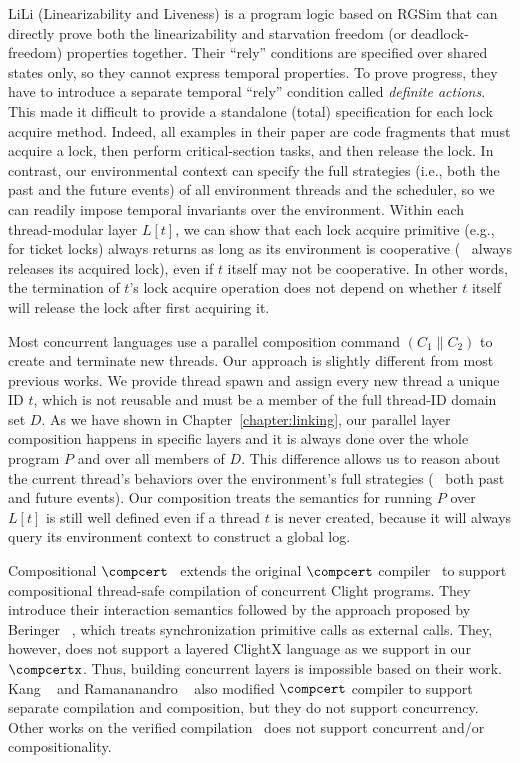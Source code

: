 LiLi (Linearizability and Liveness) is a program logic based on RGSim
that can
directly prove both the linearizability and starvation freedom (or
deadlock-freedom) properties together. 
Their ``rely'' conditions are specified
over shared states only, so they cannot express temporal properties. 
To prove progress, they have to introduce a separate temporal ``rely''
condition called {\em definite actions}.  This made it difficult to
provide a standalone (total) specification for each lock acquire
method.  Indeed, all examples in their paper are code fragments that
must acquire a lock, then perform critical-section tasks, and then release the
lock. In contrast, our environmental context can specify the full
strategies (i.e., both the past and the future events) of all
environment threads and the scheduler, so we can readily impose
temporal invariants over the environment. Within each thread-modular
layer $L[t]$, we can show that each lock acquire primitive (e.g., for
ticket locks) always returns as long as its environment is cooperative
(\eg~ always releases its acquired lock), even if $t$ itself may not
be cooperative.
In other words, the termination of $t$'s lock acquire
operation does not depend on whether $t$ itself will release the lock
after first acquiring it.

Most concurrent languages use a
parallel composition command $(C_1 \| C_2)$ to create and terminate
new threads.  
Our approach is slightly different from most previous works.
We provide thread spawn and assign every new thread a unique ID $t$,
which is not reusable and must be a member of the full thread-ID domain set $D$.
As we have shown in Chapter~\ref{chapter:linking},
our parallel layer composition happens in specific layers and it is
always done over the whole program $P$ and over
all members of $D$. 
This difference allows us to reason about the current
thread's behaviors over the environment's full strategies (\ie~ both
past and future events).
Our composition treats the semantics for running $P$ over $L[t]$ is still well
defined even if a thread $t$ is never
created, because it will always query its environment context to
construct a global log.



Compositional $\compcert$~\cite{stewart15} extends the original $\compcert$ compiler~\cite{compcert}  
to support compositional thread-safe compilation of concurrent Clight programs. 
They introduce their interaction semantics followed by the approach proposed by Beringer \etal~\cite{beringer14}, which treats
synchronization
primitive calls as external calls.
They, however, does not support a layered ClightX language as we support in our $\compcertx$.  
Thus, building concurrent layers is impossible based on their work.
Kang \etal~\cite{hur16} and Ramananandro \etal~\cite{ramananandro:2015} also modified $\compcert$ compiler to support separate compilation and composition, 
but they do not support concurrency.  
Other works on the verified compilation~\cite{Lochbihler10esop, Sevcik11popl, zhao:2013, kang:2018} does not support concurrent and/or compositionality. 


